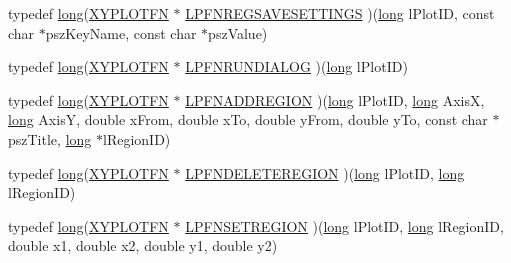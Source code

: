 \begin{DoxyCompactItemize}
\item 
typedef \hyperlink{namespacexyplot_a27bc71b0bdfac09495e7e531d8a918c5}{long}(\hyperlink{_x_y_plot_wrapper_8h_aba6cc8b3b62f2540637745c385e17016}{X\-Y\-P\-L\-O\-T\-F\-N} $\ast$ \hyperlink{namespacexyplot_a852637cd21abfcac7de9635bbd175db7}{L\-P\-F\-N\-R\-E\-G\-S\-A\-V\-E\-S\-E\-T\-T\-I\-N\-G\-S} )(\hyperlink{namespacexyplot_a27bc71b0bdfac09495e7e531d8a918c5}{long} l\-Plot\-I\-D, const char $\ast$psz\-Key\-Name, const char $\ast$psz\-Value)
\item 
typedef \hyperlink{namespacexyplot_a27bc71b0bdfac09495e7e531d8a918c5}{long}(\hyperlink{_x_y_plot_wrapper_8h_aba6cc8b3b62f2540637745c385e17016}{X\-Y\-P\-L\-O\-T\-F\-N} $\ast$ \hyperlink{namespacexyplot_a63fcd576a6d31af2655357ffa3ea7b74}{L\-P\-F\-N\-R\-U\-N\-D\-I\-A\-L\-O\-G} )(\hyperlink{namespacexyplot_a27bc71b0bdfac09495e7e531d8a918c5}{long} l\-Plot\-I\-D)
\item 
typedef \hyperlink{namespacexyplot_a27bc71b0bdfac09495e7e531d8a918c5}{long}(\hyperlink{_x_y_plot_wrapper_8h_aba6cc8b3b62f2540637745c385e17016}{X\-Y\-P\-L\-O\-T\-F\-N} $\ast$ \hyperlink{namespacexyplot_a0aaffe16c53538a1e712cdc6caef070f}{L\-P\-F\-N\-A\-D\-D\-R\-E\-G\-I\-O\-N} )(\hyperlink{namespacexyplot_a27bc71b0bdfac09495e7e531d8a918c5}{long} l\-Plot\-I\-D, \hyperlink{namespacexyplot_a27bc71b0bdfac09495e7e531d8a918c5}{long} Axis\-X, \hyperlink{namespacexyplot_a27bc71b0bdfac09495e7e531d8a918c5}{long} Axis\-Y, double x\-From, double x\-To, double y\-From, double y\-To, const char $\ast$psz\-Title, \hyperlink{namespacexyplot_a27bc71b0bdfac09495e7e531d8a918c5}{long} $\ast$l\-Region\-I\-D)
\item 
typedef \hyperlink{namespacexyplot_a27bc71b0bdfac09495e7e531d8a918c5}{long}(\hyperlink{_x_y_plot_wrapper_8h_aba6cc8b3b62f2540637745c385e17016}{X\-Y\-P\-L\-O\-T\-F\-N} $\ast$ \hyperlink{namespacexyplot_ad184f4d62ca85e471cef796c79dd0b4c}{L\-P\-F\-N\-D\-E\-L\-E\-T\-E\-R\-E\-G\-I\-O\-N} )(\hyperlink{namespacexyplot_a27bc71b0bdfac09495e7e531d8a918c5}{long} l\-Plot\-I\-D, \hyperlink{namespacexyplot_a27bc71b0bdfac09495e7e531d8a918c5}{long} l\-Region\-I\-D)
\item 
typedef \hyperlink{namespacexyplot_a27bc71b0bdfac09495e7e531d8a918c5}{long}(\hyperlink{_x_y_plot_wrapper_8h_aba6cc8b3b62f2540637745c385e17016}{X\-Y\-P\-L\-O\-T\-F\-N} $\ast$ \hyperlink{namespacexyplot_a048931557c2d0bfaa041629319bb118d}{L\-P\-F\-N\-S\-E\-T\-R\-E\-G\-I\-O\-N} )(\hyperlink{namespacexyplot_a27bc71b0bdfac09495e7e531d8a918c5}{long} l\-Plot\-I\-D, \hyperlink{namespacexyplot_a27bc71b0bdfac09495e7e531d8a918c5}{long} l\-Region\-I\-D, double x1, double x2, double y1, double y2)

\end{DoxyCompactItemize}
